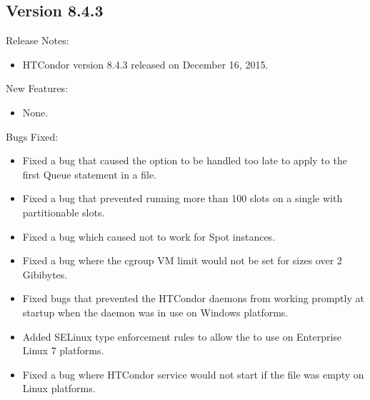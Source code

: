 \subsection*{\label{sec:New-8-4-3}Version 8.4.3}

\noindent Release Notes:

\begin{itemize}

\item HTCondor version 8.4.3 released on December 16, 2015.

\end{itemize}


\noindent New Features:

\begin{itemize}

\item None.

\end{itemize}

\noindent Bugs Fixed:

\begin{itemize}

\item Fixed a bug that caused the  option to be handled too
late to apply to the first Queue statement in a  file.

\item Fixed a bug that prevented running more than 100 slots on a single
 with partitionable slots.

\item Fixed a bug which caused 
not to work for Spot instances.

\item Fixed a bug where the cgroup VM limit would not be set for sizes over
2 Gibibytes.

\item Fixed bugs that prevented the HTCondor daemons from working promptly at
startup when the  daemon was in use on Windows platforms.

\item Added SELinux type enforcement rules to allow the 
to use  on Enterprise Linux 7 platforms.

\item Fixed a bug where HTCondor service would not start if the
 file was empty on Linux platforms.

\end{itemize}

